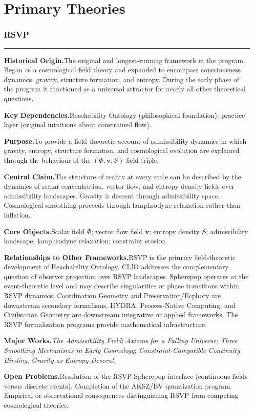 \documentclass[12pt, twoside]{article}
\newcommand{\frameworkhead}[5]{  \subsubsection{#1}
  \noindent\textcolor{#2}{\rule{\linewidth}{0.8pt}}
  \smallskip

  \noindent\textbf{Historical Origin.}\quad #3

  \noindent\textbf{Key Dependencies.}\quad #4

  \noindent\textbf{Purpose.}\quad #5
}
\newcommand{\frameworkbody}[5]{  \noindent\textbf{Central Claim.}\quad #1

  \noindent\textbf{Core Objects.}\quad #2

  \noindent\textbf{Relationships to Other Frameworks.}\quad #3

  \noindent\textbf{Major Works.}\quad #4

  \noindent\textbf{Open Problems.}\quad #5
  \medskip
}
\begin{document}
\section{Primary Theories}

\frameworkhead{RSVP}{rsvpblue}{The original and longest-running framework in the program. Began as a
cosmological field theory and expanded to encompass consciousness dynamics,
gravity, structure formation, and entropy. During the early phase of the
program it functioned as a universal attractor for nearly all other
theoretical questions.}{Reachability Ontology (philosophical foundation); practice layer
(original intuitions about constrained flow).}{To provide a field-theoretic account of admissibility dynamics in which
gravity, entropy, structure formation, and cosmological evolution are
explained through the behaviour of the $(\Phi, \mathbf{v}, S)$ field triple.}
\frameworkbody{The structure of reality at every scale can be described by the dynamics of
scalar concentration, vector flow, and entropy density fields over admissibility
landscapes. Gravity is descent through admissibility space. Cosmological
smoothing proceeds through lamphrodyne relaxation rather than inflation.}{Scalar field $\Phi$; vector flow field $\mathbf{v}$; entropy density $S$;
admissibility landscape; lamphrodyne relaxation; constraint erosion.}{RSVP is the primary field-theoretic development of Reachability Ontology.
CLIO addresses the complementary question of observer projection over RSVP
landscapes. Spherepop operates at the event-theoretic level and may describe
singularities or phase transitions within RSVP dynamics. Coordination
Geometry and Preservation/Ecphory are downstream secondary formalisms.
HYDRA, Process-Native Computing, and Civilisation Geometry are downstream
integrative or applied frameworks. The RSVP formalization programs provide
mathematical infrastructure.}{\emph{The Admissibility Field}; \emph{Axioms for a Falling Universe};
\emph{Three Smoothing Mechanisms in Early Cosmology};
\emph{Constraint-Compatible Continuity Binding}; \emph{Gravity as Entropy
Descent}.}{Resolution of the RSVP-Spherepop interface (continuous fields versus
discrete events). Completion of the AKSZ/BV quantization program. Empirical
or observational consequences distinguishing RSVP from competing cosmological
theories.}
\end{document}
